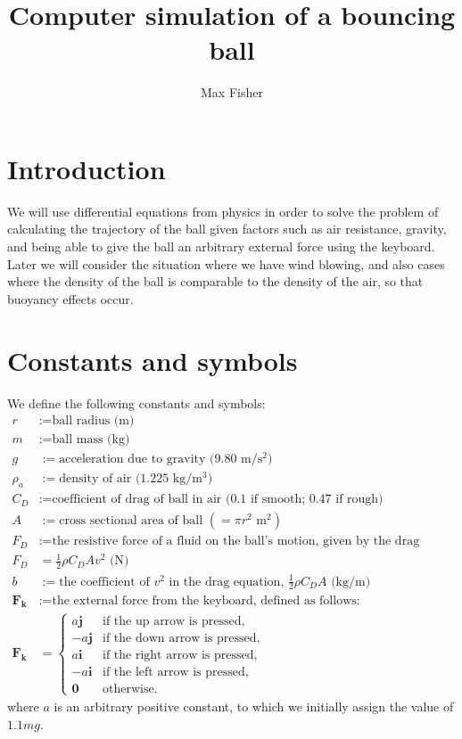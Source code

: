 \documentclass[12pt, twoside, a4paper]{article}
\renewcommand{\vec}[1]{\mathbf{#1}}
\begin{document}
\pagestyle{plain}
\title{Computer simulation of a bouncing ball}
\author{Max Fisher}
\maketitle
\section{Introduction}

We will use differential equations from physics in order to solve the problem of calculating the trajectory of the ball given factors such as air resistance, gravity, and being able to give the ball an arbitrary external force using the keyboard. Later we will consider the situation where we have wind blowing, and also cases where the density of the ball is comparable to the density of the air, so that buoyancy effects occur. 

\section{Constants and symbols}
We define the following constants and symbols:
\begin{align*}
r &:= \text{ball radius (m) } \\
m &:= \text{ball mass (kg) } \\
g &:= \text{acceleration due to gravity (9.80 m/s$^2$)} \\
\rho_a &:= \text{density of air (1.225 kg/m$^3$)} \\
C_D &:= \text{coefficient of drag of ball in air (0.1 if smooth; 0.47 if rough)} \\
A &:= \text{cross sectional area of ball } (=\pi r^2 \text{ m}^2) \\
F_D &:= \text{the resistive force of a fluid on the ball's motion, given by the drag equation:} \\
F_D &= \frac{1}{2} \rho  C_D A v^2 \text{ (N)} \\
b &:= \text{the coefficient of $v^2$ in the drag equation, } \tfrac{1}{2} \rho  C_D A \text{ (kg/m)} \\
\vec{F_k} &:=\text{the external force from the keyboard, defined as follows:} \\
\vec{F_k} &=
    \begin{cases}
        a \vec{j} & \text{if the up arrow is pressed,} \\
       -a \vec{j} & \text{if the down arrow is pressed,} \\
        a \vec{i} & \text{if the right arrow is pressed,} \\
        -a \vec{i} & \text{if the left arrow is pressed,} \\
        \vec{0} & \text{otherwise.}
    \end{cases}
\end{align*}
where $a$ is an arbitrary positive constant, to which we initially assign the value of $1.1mg$.
\pagebreak
\end{document}
